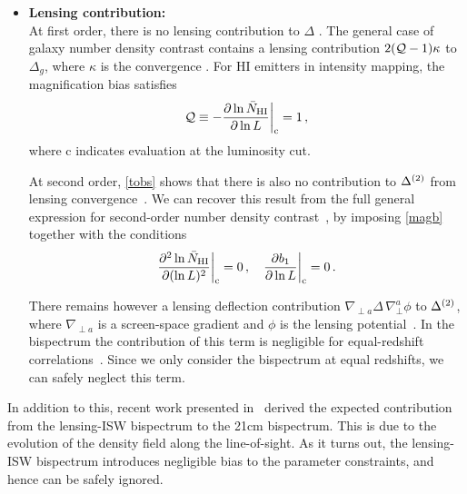 \begin{itemize}
%
%
\item {\bfseries Lensing contribution:}\\
At first order, there is no lensing contribution to $\Delta$ \cite{Hall:2012wd}. The general case of galaxy number density contrast contains a lensing  contribution $2({\cal Q}-1)\kappa$ to $\Delta_g$, where $\kappa$ is the convergence \cite{Challinor:2011bk}.  For HI emitters in intensity mapping, the magnification bias satisfies
\begin{equation}
{\mathcal{Q}} \equiv -\frac{\partial \ln \bar{N}_{{\mathrm{HI}}}}{\partial \ln L}\bigg|_\mathrm{c} = 1\,, \label{magb}
\end{equation}
where c indicates evaluation at the luminosity cut. 

At second order, \eqref{tobs} shows that there is also no contribution to $\Delta^{{(2)}}$ from lensing convergence~\cite{DiDio:2015bua,Jalivand:2018vfz}. We can recover this result from the full general expression for second-order number density contrast~\cite{Bertacca:2014dra, Bertacca:2014wga, Yoo:2014sfa, DiDio:2014lka, Bertacca:2014hwa}, by imposing \eqref{magb} together with the conditions~\cite{DiDio:2015bua}
\begin{equation} \label{magb2}
\frac{\partial^2 \ln \bar{N}_{{\mathrm{HI}}}}{\partial (\ln L)^2}\bigg|_\mathrm{c} = 0\,, \quad  \frac{\partial b_1}{\partial \ln L}\bigg|_\mathrm{c}=0\,.
\end{equation}

There remains however a lensing deflection contribution $\nabla_{\perp a}\Delta\,\nabla_\perp^a\phi$ to  $\Delta^{{(2)}}$,  where $\nabla_{\perp a}$ is a screen-space gradient and $\phi$ is the lensing potential~\cite{Umeh:2015gza,DiDio:2015bua,Jalivand:2018vfz}. In the bispectrum the contribution of this term is negligible for equal-redshift correlations~\cite{DiDio:2015bua,Durrer:2020orn}. Since we only consider the bispectrum at equal redshifts, we can safely neglect this term. 
\end{itemize}

In addition to this, recent work presented in~\cite{Schmit:2018rtf} derived the expected contribution from the lensing-ISW bispectrum to the 21cm bispectrum. This is due to the evolution of the density field along the line-of-sight. As it turns out, the lensing-ISW bispectrum introduces negligible bias to the parameter constraints, and hence can be safely ignored. 

